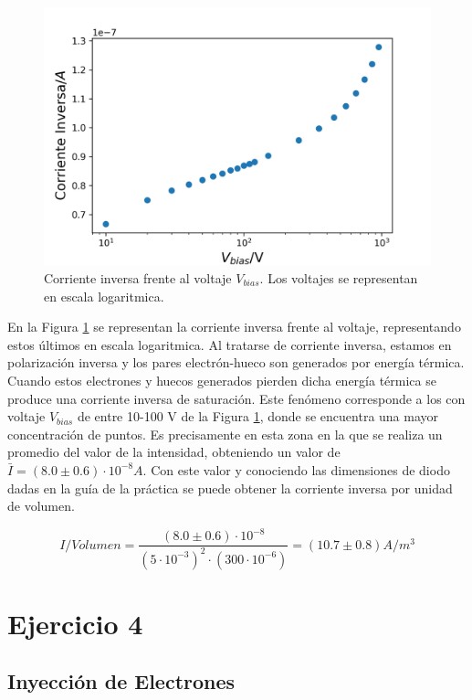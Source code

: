\documentclass[twoside]{article}
\begin{document}
		\begin{figure}[H]
			\centering
			\includegraphics[scale=0.8]{todos.png}
			\caption{\label{Img:I-V}Corriente inversa frente al voltaje $V_{bias}$. Los voltajes se representan en escala logaritmica.}
		\end{figure}

		En la Figura \ref{Img:I-V} se representan la corriente inversa frente al voltaje, representando estos últimos en escala logaritmica. Al tratarse de corriente inversa, estamos en polarización inversa y los pares electrón-hueco son generados por energía térmica. Cuando estos electrones y huecos generados pierden dicha energía térmica se produce una corriente inversa de saturación. Este fenómeno corresponde a los con voltaje $V_{bias}$ de entre 10-100 V  de la Figura \ref{Img:I-V}, donde se encuentra una mayor concentración de puntos. Es precisamente en esta zona en la que se realiza un promedio del valor de la intensidad, obteniendo un valor de $\bar{I} = (8.0 \pm 0.6) \cdot 10^{-8} A$. Con este valor y conociendo las dimensiones de diodo dadas en la guía de la práctica \cite{guia} se puede obtener la corriente inversa por unidad de volumen.

			\begin{equation}
				I/V{olumen} = \frac{(8.0 \pm 0.6) \cdot 10^{-8}}{(5\cdot 10^{-3})^2\cdot (300 \cdot 10^{-6})} = (10.7 \pm 0.8) A/m^3
			\end{equation}
	
	\section{Ejercicio 4}

		\subsection{Inyección de Electrones}
\end{document}
